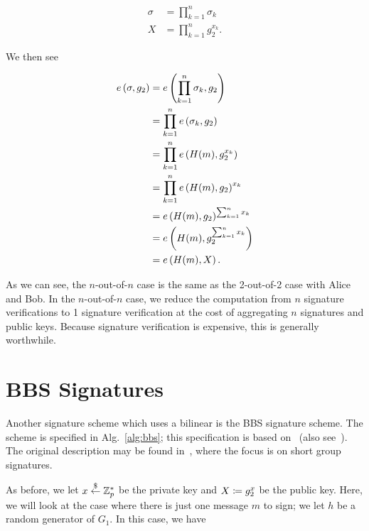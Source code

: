 \begin{align}
    \sigma &= \prod_{k=1}^{n} \sigma_{k}
        \nonumber\\
    X &= \prod_{k=1}^{n} g_{2}^{x_{k}}.
\end{align}

\noindent
We then see

\begin{align}
    e\left( \sigma, g_{2} \right) &= e\left( \prod_{k=1}^{n}\sigma_{k}, g_{2} \right)
            \nonumber\\
        &= \prod_{k=1}^{n} e\left( \sigma_{k}, g_{2} \right)
            \nonumber\\
        &= \prod_{k=1}^{n} e\left( H(m), g_{2}^{x_{k}} \right)
            \nonumber\\
        &= \prod_{k=1}^{n} e\left( H(m), g_{2} \right)^{x_{k}}
            \nonumber\\
        &= e\left( H(m), g_{2} \right)^{\sum_{k=1}^{n}x_{k}}
            \nonumber\\
        &= e\left( H(m), g_{2}^{\sum_{k=1}^{n}x_{k}} \right)
            \nonumber\\
        &= e\left( H(m), X \right).
\end{align}

\noindent
As we can see, the $n$-out-of-$n$ case is the same as the 2-out-of-2
case with Alice and Bob.
In the $n$-out-of-$n$ case, we reduce the computation from $n$
signature verifications
to 1 signature verification at the cost of aggregating $n$ signatures
and public keys.
Because signature verification is expensive,
this is generally worthwhile.



\section{BBS Signatures}
\label{sec:pairing_bbs}

Another signature scheme which uses a \gls{bilinear}
is the BBS signature scheme.
The scheme is specified in Alg.~\ref{alg:bbs};
this specification is based on~\cite[Figure 3]{cryptoeprint:2023/275}
(also see~\cite{tessaro2023revisiting}).
The original description may be found
in~\cite{boneh2004short,cryptoeprint:2004/174},
where the focus is on short group signatures.



As before, we let $x\stackrel{\$}{\leftarrow}{}\mathbb{Z}_{p}^{*}$ be the private key
and $X\coloneqq{} g_{2}^{x}$ be the public key.
Here, we will look at the case where there is just one message $m$ to sign;
we let $h$ be a random generator of $G_{1}$.
In this case, we have

